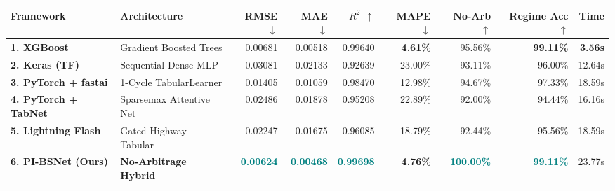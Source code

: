 \documentclass[11pt]{article}
\begin{document}
{\renewcommand{\arraystretch}{1.04}
\setlength{\tabcolsep}{3.4pt}
\scriptsize
\begin{tabular}{@{}llrrrrrrr@{}}
\toprule
\textbf{Framework} & \textbf{Architecture} & \textbf{RMSE $\downarrow$} & \textbf{MAE $\downarrow$} & \textbf{$R^2$ $\uparrow$} & \textbf{MAPE $\downarrow$} & \textbf{No-Arb $\uparrow$} & \textbf{Regime Acc $\uparrow$} & \textbf{Time} \\
\midrule
\textbf{1. XGBoost} & Gradient Boosted Trees & 0.00681 & 0.00518 & 0.99640 & \textbf{4.61\%} & 95.56\% & \textbf{99.11\%} & \textbf{3.56s} \\
\textbf{2. Keras (TF)} & Sequential Dense MLP & 0.03081 & 0.02133 & 0.92639 & 23.00\% & 93.11\% & 96.00\% & 12.64s \\
\textbf{3. PyTorch + fastai} & 1-Cycle TabularLearner & 0.01405 & 0.01059 & 0.98470 & 12.98\% & 94.67\% & 97.33\% & 18.59s \\
\textbf{4. PyTorch + TabNet} & Sparsemax Attentive Net & 0.02486 & 0.01878 & 0.95208 & 22.89\% & 92.00\% & 94.44\% & 16.16s \\
\textbf{5. Lightning Flash} & Gated Highway Tabular & 0.02247 & 0.01675 & 0.96085 & 18.79\% & 92.44\% & 95.56\% & 18.59s \\
\midrule
\textbf{\color{teal}6. PI-BSNet (Ours)} & \textbf{\color{teal}No-Arbitrage Hybrid} & \textcolor{teal}{\textbf{0.00624}} & \textcolor{teal}{\textbf{0.00468}} & \textcolor{teal}{\textbf{0.99698}} & \textbf{4.76\%} & \textcolor{teal}{\textbf{100.00\%}} & \textcolor{teal}{\textbf{99.11\%}} & 23.77s \\
\bottomrule
\end{tabular}\par}

\vspace{0.06cm}
\newpage
\end{document}
